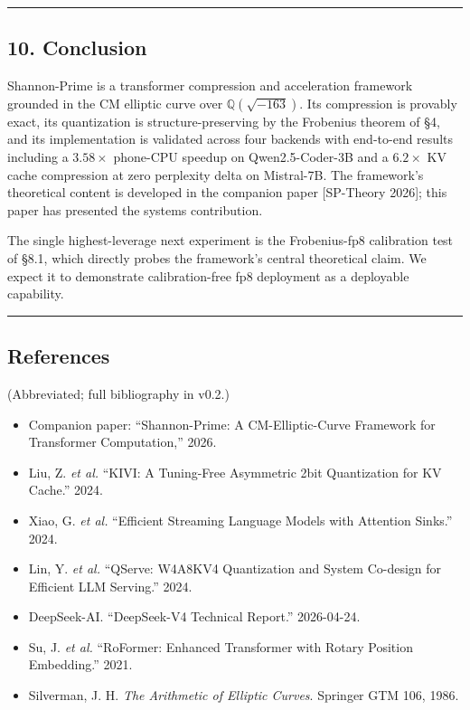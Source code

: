 \documentclass[
  11pt,
]{article}
\providecommand{\tightlist}{%
  \setlength{\itemsep}{0pt}\setlength{\parskip}{0pt}}
\begin{document}
\begin{center}\rule{0.5\linewidth}{0.5pt}\end{center}

\hypertarget{conclusion}{%
\subsection{10. Conclusion}\label{conclusion}}

Shannon-Prime is a transformer compression and acceleration framework
grounded in the CM elliptic curve over \(\mathbb{Q}(\sqrt{-163})\). Its
compression is provably exact, its quantization is structure-preserving
by the Frobenius theorem of §4, and its implementation is validated
across four backends with end-to-end results including a \(3.58\times\)
phone-CPU speedup on Qwen2.5-Coder-3B and a \(6.2\times\) KV cache
compression at zero perplexity delta on Mistral-7B. The framework's
theoretical content is developed in the companion paper {[}SP-Theory
2026{]}; this paper has presented the systems contribution.

The single highest-leverage next experiment is the Frobenius-fp8
calibration test of §8.1, which directly probes the framework's central
theoretical claim. We expect it to demonstrate calibration-free fp8
deployment as a deployable capability.

\begin{center}\rule{0.5\linewidth}{0.5pt}\end{center}

\hypertarget{references}{%
\subsection{References}\label{references}}

(Abbreviated; full bibliography in v0.2.)

\begin{itemize}
\tightlist
\item
  Companion paper: ``Shannon-Prime: A CM-Elliptic-Curve Framework for
  Transformer Computation,'' 2026.
\item
  Liu, Z. \emph{et al.} ``KIVI: A Tuning-Free Asymmetric 2bit
  Quantization for KV Cache.'' 2024.
\item
  Xiao, G. \emph{et al.} ``Efficient Streaming Language Models with
  Attention Sinks.'' 2024.
\item
  Lin, Y. \emph{et al.} ``QServe: W4A8KV4 Quantization and System
  Co-design for Efficient LLM Serving.'' 2024.
\item
  DeepSeek-AI. ``DeepSeek-V4 Technical Report.'' 2026-04-24.
\item
  Su, J. \emph{et al.} ``RoFormer: Enhanced Transformer with Rotary
  Position Embedding.'' 2021.
\item
  Silverman, J. H. \emph{The Arithmetic of Elliptic Curves}. Springer
  GTM 106, 1986.
\end{itemize}
\end{document}
